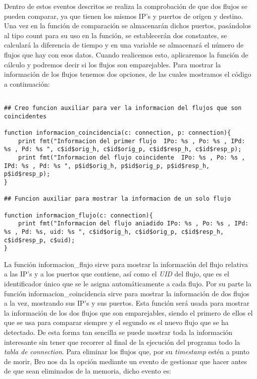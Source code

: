 \noindent Dentro de estos eventos descritos se realiza la comprobación de que dos 
flujos se pueden comparar, ya que tienen los mismos IP’s y puertos de 
origen y destino. Una vez en la función de comparación se almacenarán 
dichos puertos, pasándolos al tipo count para su uso en la función, se 
establecerán dos constantes, se calculará la diferencia de tiempo y en 
una variable se almacenará el número de flujos que hay con esos datos. 
Cuando realicemos esto, aplicaremos la función de cálculo y podremos 
decir si los flujos son emparejables.
\intro
Para mostrar la información de los flujos tenemos dos opciones, de las 
cuales mostramos el código a continuación:
\intro
\begin{lstlisting}[style=CodigoC]

## Creo funcion auxiliar para ver la informacion del flujos que son coincidentes

function informacion_coincidencia(c: connection, p: connection){
    print fmt("Informacion del primer flujo  IPo: %s , Po: %s , IPd: %s , Pd: %s ", c$id$orig_h, c$id$orig_p, c$id$resp_h, c$id$resp_p);
    print fmt("Informacion del flujo coincidente  IPo: %s , Po: %s , IPd: %s , Pd: %s ", p$id$orig_h, p$id$orig_p, p$id$resp_h, p$id$resp_p);
}

## Funcion auxiliar para mostrar la informacion de un solo flujo

function informacion_flujo(c: connection){
    print fmt("Informacion del flujo aniadido IPo: %s , Po: %s , IPd: %s , Pd: %s, uid: %s ", c$id$orig_h, c$id$orig_p, c$id$resp_h, c$id$resp_p, c$uid);
}

\end{lstlisting}

\noindent La función informacion\_flujo sirve para mostrar la información del flujo 
relativa a las IP’s y a los puertos que contiene, así como el \textit{UID} 
del flujo, que es el identificador único que se le asigna automáticamente 
a cada flujo. 
\intro
Por su parte la función informacion\_coincidencia sirve para mostrar la 
información de dos flujos a la vez, mostrando sus IP’s y sus puertos. 
Esta función será usada para mostrar la información de los dos flujos que 
son emparejables, siendo el primero de ellos el que se usa para comparar siempre 
y el segundo es el nuevo flujo que se ha detectado. De esta forma tan sencilla 
se puede mostrar toda la información interesante sin tener que recorrer al final de 
la ejecución del programa todo la \textit{tabla de connection}.
\intro
Para eliminar los flujos que, por su \textit{timestamp} estén a punto de morir, Bro nos 
da la opción mediante un evento de gestionar que hacer antes de que sean eliminados 
de la memoria, dicho evento es: 

